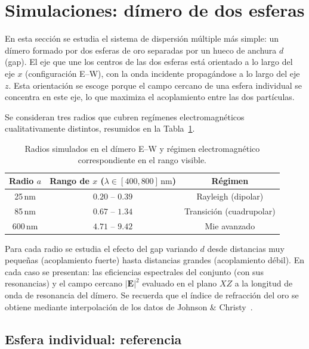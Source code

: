 \section{Simulaciones: dímero de dos esferas}
\label{sec:dimero}

En esta sección se estudia el sistema de dispersión múltiple más simple: un
dímero formado por dos esferas de oro separadas por un hueco de
anchura $d$ (gap). El eje que une los centros de las dos esferas está orientado
a lo largo del eje $x$ (configuración E--W), con la onda incidente
propagándose a lo largo del eje $z$. Esta orientación se escoge porque el
campo cercano de una esfera individual se concentra en este eje, lo que
maximiza el acoplamiento entre las dos partículas.

Se consideran tres radios que cubren regímenes electromagnéticos
cualitativamente distintos, resumidos en la Tabla~\ref{tab:dimero_regimenes}.

\begin{table}[H]
  \centering
  \begin{tabular}{ccc}
    \hline
    Radio $a$ & Rango de $x$ ($\lambda\in[400,800]\,\text{nm}$) & Régimen \\
    \hline
    25\,nm  & $0.20$ -- $0.39$ & Rayleigh (dipolar) \\
    85\,nm  & $0.67$ -- $1.34$ & Transición (cuadrupolar) \\
    600\,nm & $4.71$ -- $9.42$ & Mie avanzado \\
    \hline
  \end{tabular}
  \caption{Radios simulados en el dímero E--W y régimen electromagnético
           correspondiente en el rango visible.}
  \label{tab:dimero_regimenes}
\end{table}

Para cada radio se estudia el efecto del gap variando $d$ desde distancias
muy pequeñas (acoplamiento fuerte) hasta distancias grandes 
(acoplamiento débil). En cada caso se presentan: las eficiencias
espectrales del conjunto (con sus resonancias) y el campo cercano 
$|\mathbf{E}|^2$ evaluado en el
plano $XZ$ a la longitud de onda de resonancia del dímero.
Se recuerda que el índice de refracción
del oro se obtiene mediante interpolación de los datos 
de Johnson \& Christy~\cite{johnson1972optical}.


\subsection{Esfera individual: referencia}
\label{subsec:dimero_ref}

